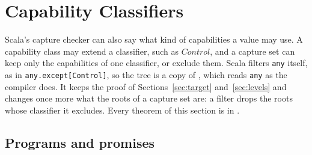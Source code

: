 \section{Capability Classifiers}\label{sec:classifiers}
\mathtgt

\providecommand{\kindof}[1]{\mathit{kind}(#1)}
\providecommand{\baseof}[1]{\mathit{base}(#1)}
\providecommand{\subkind}[2]{#1 \sqsubseteq_{\mathsf{k}} #2}
\providecommand{\admstep}[2]{#1 \sqsubseteq^{=}_{\mathsf{k}} #2}
\providecommand{\kempty}[1]{\mathit{empty}(#1)}
\providecommand{\clchild}[2]{\mathsf{child}_{#1}(#2)}
\providecommand{\tstate}{\tgt{\mathit{ts}}}

Scala's capture checker can also say what kind of capabilities a value may use. A capability class may extend a classifier, such as $\mathit{Control}$, and a capture set can keep only the capabilities of one classifier, or exclude them. Scala filters \lstinline{any} itself, as in \lstinline{any.except[Control]}, so the tree \treeCL is a copy of \treeCC, which reads \lstinline{any} as the compiler does. It keeps the proof of Sections~\ref{sec:target} and~\ref{sec:levels} and changes once more what the roots of a capture set are: a filter drops the roots whose classifier it excludes. Every theorem of this section is in \treeCL.

\subsection{Programs and promises}\label{sec:cl-programs}

